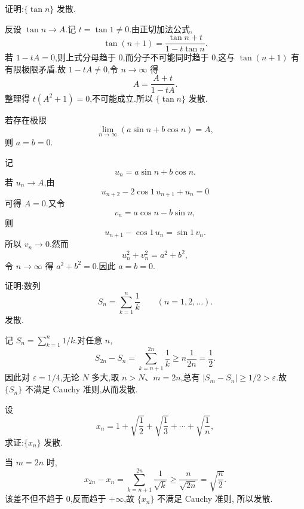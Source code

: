 \begin{example}
  证明:$\{\tan n\}$ 发散.
\end{example}
\exampleblank

\begin{solution}
  反设 $\tan n\to A$.记 $t=\tan1\neq0$.由正切加法公式,
  \[
    \tan(n+1)=\dfrac{\tan n+t}{1-t\tan n}.
  \]
  若 $1-tA=0$,则上式分母趋于 $0$,而分子不可能同时趋于 $0$,这与
  $\tan(n+1)$ 有有限极限矛盾.故 $1-tA\neq0$,令 $n\to\infty$ 得
  \[
    A=\dfrac{A+t}{1-tA}.
  \]
  整理得 $t(A^2+1)=0$,不可能成立.所以 $\{\tan n\}$ 发散.
\end{solution}

\begin{example}
  若存在极限
  \[
    \lim\limits_{n\to\infty}(a\sin n+b\cos n)=A,
  \]
  则 $a=b=0$.
\end{example}
\exampleblank

\begin{solution}
  记
  \[
    u_n=a\sin n+b\cos n.
  \]
  若 $u_n\to A$,由
  \[
    u_{n+2}-2\cos1\,u_{n+1}+u_n=0
  \]
  可得 $A=0$.又令
  \[
    v_n=a\cos n-b\sin n,
  \]
  则
  \[
    u_{n+1}-\cos1\,u_n=\sin1\,v_n.
  \]
  所以 $v_n\to0$.然而
  \[
    u_n^2+v_n^2=a^2+b^2,
  \]
  令 $n\to\infty$ 得 $a^2+b^2=0$.因此 $a=b=0$.
\end{solution}




\begin{example}
  证明:数列
  \[
    S_n=\sum\limits_{k=1}^n\dfrac{1}{k}\qquad(n=1,2,\ldots).
  \]
  发散.
\end{example}
\exampleblank

\begin{solution}
  记 $S_n=\displaystyle \sum\limits_{k=1}^n1/k$.对任意 $n$,
  \[
    S_{2n}-S_n=\sum\limits_{k=n+1}^{2n}\dfrac{1}{k}
    \geq n\dfrac{1}{2n}=\dfrac{1}{2}.
  \]
  因此对 $\varepsilon=1/4$,无论 $N$ 多大,取 $n>N$、$m=2n$,总有
  $|S_m-S_n|\geq1/2>\varepsilon$.故 $\{S_n\}$ 不满足 Cauchy 准则,从而发散.
\end{solution}

\begin{example}
  设
  \[
    x_n=1+\sqrt{\dfrac{1}{2}}+\sqrt{\dfrac{1}{3}}+\cdots+\sqrt{\dfrac{1}{n}},
  \]
  求证:$\{x_n\}$ 发散.
\end{example}
\exampleblank

\begin{solution}
  当 $m=2n$ 时,
  \[
    x_{2n}-x_n
    =\sum\limits_{k=n+1}^{2n}\dfrac{1}{\sqrt k}
    \geq\dfrac{n}{\sqrt{2n}}=\sqrt{\dfrac{n}{2}}.
  \]
  该差不但不趋于 $0$,反而趋于 $+\infty$,故 $\{x_n\}$ 不满足 Cauchy 准则,
  所以发散.
\end{solution}



